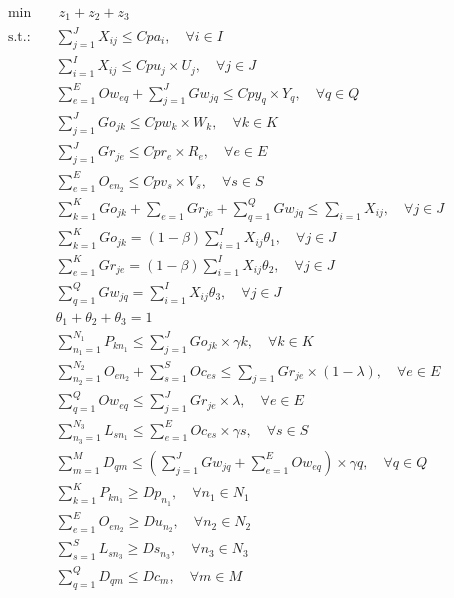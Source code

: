 \documentclass[sn-nature]{sn-jnl}%
\theoremstyle{thmstyleone}%
\theoremstyle{thmstyletwo}%
\theoremstyle{thmstylethree}%
\begin{document}
    
\begin{align}
    \min &\ z_1 + z_2 + z_3 \label{eq:custo}\\
    \text{s.t.:} \quad & \sum\limits_{j=1}^J X_{ij} \le Cpa_i, \quad \forall i \in I \label{eq:restricao1}\\
    & \sum\limits_{i=1}^I X_{ij} \le Cpu_j\times U_j, \quad \forall j \in J \label{eq:restricao2}\\
    & \sum\limits_{e=1}^E Ow_{eq} + \sum\limits_{j=1}^J Gw_{jq} \le Cpy_q \times Y_q, \quad \forall q \in Q \label{eq:restricao3}\\
    & \sum\limits_{j=1}^J Go_{jk} \le Cpw_k\times W_k, \quad \forall k \in K \label{eq:restricao4}\\
    & \sum\limits_{j=1}^J Gr_{je} \le Cpr_e\times R_e, \quad \forall e \in E \label{eq:restricao5}\\
    & \sum\limits_{e=1}^E O_{en_2} \le Cpv_s\times V_s, \quad \forall s \in S \label{eq:restricao6}\\
    & \sum\limits_{k=1}^K Go_{jk} + \sum\limits_{e=1} Gr_{je} + \sum\limits_{q=1}^Q Gw_{jq} \le \sum\limits_{i=1} X_{ij}, \quad \forall j \in J \label{eq:restricao7} \\
    & \sum\limits_{k=1}^K Go_{jk} = (1-\beta) \sum\limits_{i=1}^I X_{ij}\theta_1, \quad \forall j\in J \label{eq:restricao8}\\
    & \sum\limits_{e=1}^K Gr_{je} = (1-\beta) \sum\limits_{i=1}^I X_{ij}\theta_2, \quad \forall j\in J \label{eq:restricao9}\\
    & \sum\limits_{q=1}^Q Gw_{jq} = \sum\limits_{i=1}^I X_{ij}\theta_3, \quad \forall j\in J \label{eq:restricao10}\\
    & \theta_1 + \theta_2 + \theta_3 = 1 \label{eq:restricao11}\\
    & \sum\limits_{n_1=1}^{N_1} P_{kn_1} \le \sum\limits_{j=1}^J Go_{jk} \times \gamma k, \quad \forall k \in K \label{eq:restricao12}\\
    & \sum\limits_{n_2=1}^{N_2} O_{en_2} + \sum\limits_{s=1}^S Oc_{es} \le \sum\limits_{j=1} Gr_{je}\times(1-\lambda), \quad \forall e\in E \label{eq:restricao13}\\
    & \sum\limits_{q=1}^{Q} Ow_{eq} \le \sum\limits_{j=1}^J Gr_{je} \times \lambda, \quad \forall e \in E \label{eq:restricao14}\\
    & \sum\limits_{n_3=1}^{N_3} L_{sn_1} \le \sum\limits_{e=1}^E Oc_{es} \times \gamma s, \quad \forall s \in S \label{eq:restricao15}\\
    & \sum\limits_{m=1}^M D_{qm} \le \left(\sum\limits_{j=1}^J Gw_{jq} + \sum\limits_{e=1}^E Ow_{eq} \right) \times \gamma q, \quad \forall q \in Q \label{eq:restricao16}\\
    & \sum\limits_{k=1}^K P_{kn_1} \ge Dp_{n_1}, \quad \forall n_1 \in N_1 \label{eq:restricao17}\\
    & \sum\limits_{e=1}^E O_{en_2} \ge Du_{n_2}, \quad \forall n_2 \in N_2 \label{eq:restricao18}\\
    & \sum\limits_{s=1}^S L_{sn_3} \ge Ds_{n_3}, \quad \forall n_3 \in N_3 \label{eq:restricao19}\\
    & \sum\limits_{q=1}^Q D_{qm} \le Dc_{m}, \quad \forall m \in M \label{eq:restricao20}
\end{align}
\end{document}
